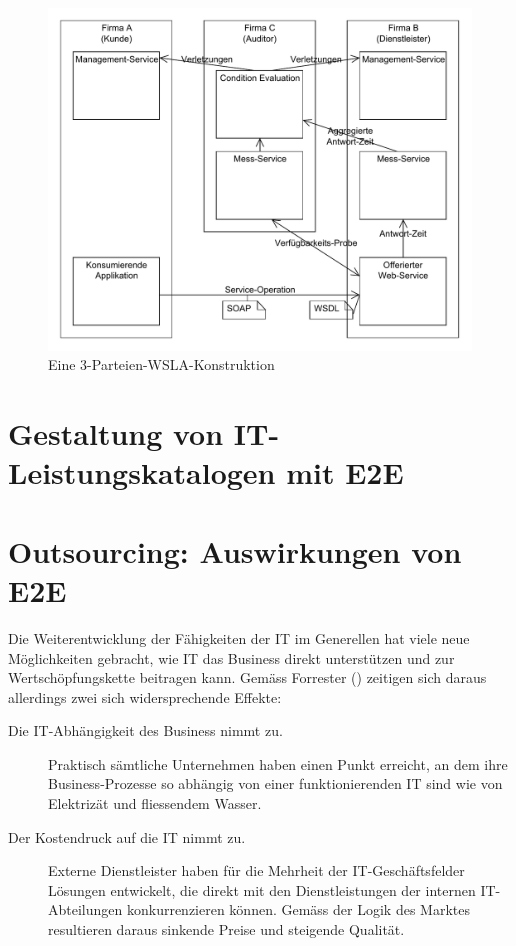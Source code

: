 \documentclass[11pt,listof=totoc]{scrreprt} %
\theoremstyle{definition}
\begin{document}
\begin{figure}
\caption{Eine 3-Parteien-WSLA-Konstruktion}
\label{wslaone}
\includegraphics[scale=0.7]{diagramme/wsla_basic.pdf}
\end{figure}

\section{Gestaltung von IT-Leistungskatalogen mit E2E}

\section{Outsourcing: Auswirkungen von E2E}

Die Weiterentwicklung der Fähigkeiten der IT im Generellen hat viele neue Möglichkeiten gebracht, wie IT das Business direkt unterstützen und zur Wertschöpfungskette beitragen kann. Gemäss Forrester (\cite{forrester:slaBestPractices}) zeitigen sich daraus allerdings zwei sich widersprechende Effekte:

\begin{description}
\item[Die IT-Abhängigkeit des Business nimmt zu.] Praktisch sämtliche Unternehmen haben einen Punkt erreicht, an dem ihre Business-Prozesse so abhängig von einer funktionierenden IT sind wie von Elektrizät und fliessendem Wasser.
\item[Der Kostendruck auf die IT nimmt zu.] Externe Dienstleister haben für die Mehrheit der IT-Geschäftsfelder Lösungen entwickelt, die direkt mit den Dienstleistungen der internen IT-Abteilungen konkurrenzieren können. Gemäss der Logik des Marktes resultieren daraus sinkende Preise und steigende Qualität.
\end{description}
\end{document}
